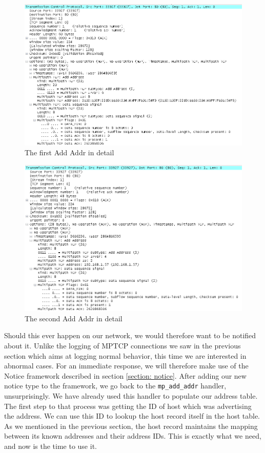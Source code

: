 \begin{figure}[!t]
\centering
\includegraphics[scale = 0.75, angle = 90]{Figures/addaddr1.png}
\caption{The first Add Addr in detail}
\label{pic:2 adds detail1}
\end{figure}

\begin{figure}[!t]
\centering
\includegraphics[scale = 0.75, angle = 90]{Figures/addaddr2.png}
\caption{The second Add Addr in detail}
\label{pic:2 adds detail2}
\end{figure}



Should this ever happen on our network, we would therefore want to be notified about it. Unlike the logging of MPTCP connections we saw in the previous section which aims at logging normal behavior, this time we are interested in abnormal cases. For an immediate response, we will therefore make use of the Notice framework described in section \ref{section: notice}. After adding our new notice type to the framework, we go back to the \texttt{mp\_add\_addr} handler, unsurprisingly. We have already used this handler to populate our address table. The first step to that process was getting the ID of host which was advertising the address. We can use this ID to lookup the host record itself in the host table. As we mentioned in the previous section, the host record maintains the mapping between its known addresses and their address IDs. This is exactly what we need, and now is the time to use it. \\

